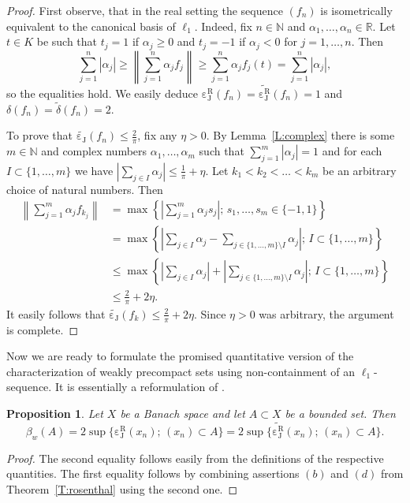 \documentclass{amsart}
\numberwithin{equation}{section}
\newtheorem{prop}[thm]{Proposition}
\theoremstyle{definition}
\def\en{\mathbb N}
\def\er{\mathbb R}
\def\wde#1{\widetilde{\delta}\left(#1\right)}
\def\de#1{\delta\left(#1\right)}
\def\dcj#1{\widetilde{\operatorname{\varepsilon_J}}\left(#1\right)}
\def\cjr#1{\operatorname{\varepsilon_J^R}\left(#1\right)}
\def\dcjr#1{\widetilde{\operatorname{\varepsilon_J^R}}\left(#1\right)}
\newcommand{\norm}[1]{\left\|#1\right\|}
\newcommand{\abs}[1]{\left|#1\right|}
\newcommand{\setsep}{;\,}
\begin{document}
\begin{proof}
    First observe, that in the real setting the sequence $(f_n)$ is isometrically equivalent to the canonical basis of $\ell_1$. Indeed, fix $n\in\en$ and $\alpha_1,\dots,\alpha_n\in\er$. Let
    $t\in K$ be such that $t_j=1$ if $\alpha_j\ge0$ and $t_j=-1$ if $\alpha_j<0$ for $j=1,\dots,n$. Then
    $$\sum_{j=1}^n\abs{\alpha_j}\ge\norm{\sum_{j=1}^n\alpha_jf_j}\ge \sum_{j=1}^n\alpha_jf_j(t)=\sum_{j=1}^n\abs{\alpha_j},$$
    so the equalities hold. We easily deduce  $\cjr{f_n}=\dcjr{f_n}=1$ and  $\de{f_n}=\wde{f_n}=2$.

    
    To prove that $\dcj{f_n}\le\frac2\pi$, fix any $\eta>0$. By Lemma~\ref{L:complex} there is some $m\in\en$ and complex numbers $\alpha_1,\dots,\alpha_m$ such that $\sum_{j=1}^m\abs{\alpha_j}=1$ and for each $I\subset \{1,\dots,m\}$ we have $\abs{\sum_{j\in I}\alpha_j}\le\frac1\pi+\eta$. Let $k_1<k_2<\dots<k_m$ be an arbitrary choice of natural numbers. Then
    $$\begin{aligned}
      \norm{\sum_{j=1}^m \alpha_j f_{k_j}}&=\max\left\{\abs{\sum_{j=1}^m \alpha_j s_j}\setsep s_1,\dots,s_m\in\{-1,1\}\right\}  
      \\  &= \max\left\{\abs{\sum_{j\in I} \alpha_j - \sum_{j\in \{1,\dots,m\}\setminus I} \alpha_j }\setsep I\subset\{1,\dots,m\}\right\}  
      \\&\le  \max\left\{\abs{\sum_{j\in I} \alpha_j} +\abs{\sum_{j\in \{1,\dots,m\}\setminus I} \alpha_j }\setsep I\subset\{1,\dots,m\}\right\}  
      \\&\le\frac2\pi+2\eta.
    \end{aligned}$$
   It easily follows that $\dcj{f_k}\le \frac2\pi+2\eta$. Since $\eta>0$ was arbitrary, the argument is complete.
    
\end{proof}


Now we are ready to formulate the promised quantitative version of the characterization of
weakly precompact sets using non-containment of an $\ell_1$-sequence. It is essentially a reformulation of \cite[Theorem 2.1]{rodr-ep-wpc}.
 
\begin{prop}\label{P:betaw}
    Let $X$ be a Banach space and let $A\subset X$ be a bounded set. Then
    $$\beta_w(A) = 2 \sup\{ \cjr{x_n}\setsep (x_n)\subset A\}
    = 2 \sup\{ \dcjr{x_n}\setsep (x_n)\subset A\}.$$
\end{prop}

\begin{proof}
    The second equality follows easily from the definitions of the respective quantities. 
    The first equality follows by combining assertions $(b)$ and $(d)$ from Theorem~\ref{T:rosenthal} 
    using the second one. 
\end{proof}
\end{document}
